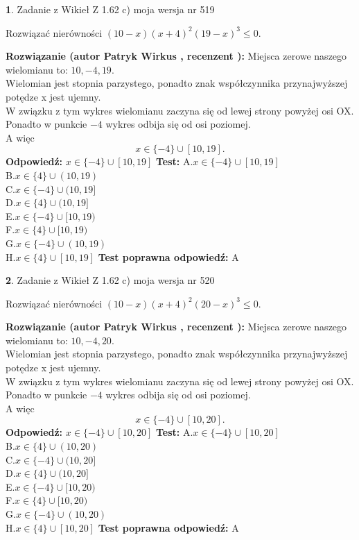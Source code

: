 \documentclass[12pt, a4paper]{article}
\theoremstyle{definition} %
\newtheorem{zad}{}
\newcommand{\zadStart}[1]{\begin{zad}#1\newline}
\newcommand{\zadStop}{\end{zad}}
\newcommand{\rozwStart}[2]{\noindent \textbf{Rozwiązanie (autor #1 , recenzent #2): }\newline}
\newcommand{\rozwStop}{\newline}
\newcommand{\odpStart}{\noindent \textbf{Odpowiedź:}\newline}
\newcommand{\odpStop}{\newline}
\newcommand{\testStart}{\noindent \textbf{Test:}\newline}
\newcommand{\testStop}{\newline}
\newcommand{\kluczStart}{\noindent \textbf{Test poprawna odpowiedź:}\newline}
\newcommand{\kluczStop}{\newline}
\begin{document}
\zadStart{Zadanie z Wikieł Z 1.62 c) moja wersja nr 519}

Rozwiązać nierówności $(10-x)(x+4)^{2}(19-x)^{3}\le0$.
\zadStop
\rozwStart{Patryk Wirkus}{}
Miejsca zerowe naszego wielomianu to: $10, -4, 19$.\\
Wielomian jest stopnia parzystego, ponadto znak współczynnika przy\linebreak najwyższej potędze x jest ujemny.\\ W związku z tym wykres wielomianu zaczyna się od lewej strony powyżej osi OX.\\
Ponadto w punkcie $-4$ wykres odbija się od osi poziomej.\\
A więc $$x \in \{-4\} \cup [10,19].$$
\rozwStop
\odpStart
$x \in \{-4\} \cup [10,19]$
\odpStop
\testStart
A.$x \in \{-4\} \cup [10,19]$\\
B.$x \in \{4\} \cup (10,19)$\\
C.$x \in \{-4\} \cup (10,19]$\\
D.$x \in \{4\} \cup (10,19]$\\
E.$x \in \{-4\} \cup [10,19)$\\
F.$x \in \{4\} \cup [10,19)$\\
G.$x \in \{-4\} \cup (10,19)$\\
H.$x \in \{4\} \cup [10,19]$
\testStop
\kluczStart
A
\kluczStop



\zadStart{Zadanie z Wikieł Z 1.62 c) moja wersja nr 520}

Rozwiązać nierówności $(10-x)(x+4)^{2}(20-x)^{3}\le0$.
\zadStop
\rozwStart{Patryk Wirkus}{}
Miejsca zerowe naszego wielomianu to: $10, -4, 20$.\\
Wielomian jest stopnia parzystego, ponadto znak współczynnika przy\linebreak najwyższej potędze x jest ujemny.\\ W związku z tym wykres wielomianu zaczyna się od lewej strony powyżej osi OX.\\
Ponadto w punkcie $-4$ wykres odbija się od osi poziomej.\\
A więc $$x \in \{-4\} \cup [10,20].$$
\rozwStop
\odpStart
$x \in \{-4\} \cup [10,20]$
\odpStop
\testStart
A.$x \in \{-4\} \cup [10,20]$\\
B.$x \in \{4\} \cup (10,20)$\\
C.$x \in \{-4\} \cup (10,20]$\\
D.$x \in \{4\} \cup (10,20]$\\
E.$x \in \{-4\} \cup [10,20)$\\
F.$x \in \{4\} \cup [10,20)$\\
G.$x \in \{-4\} \cup (10,20)$\\
H.$x \in \{4\} \cup [10,20]$
\testStop
\kluczStart
A
\kluczStop
\end{document}
